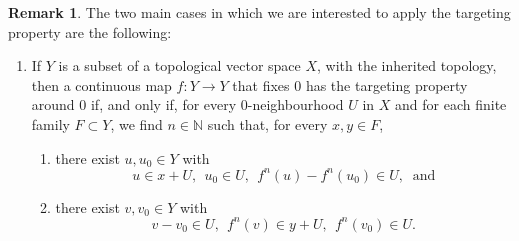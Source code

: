 \documentclass[12pt,english]{amsart}
\numberwithin{equation}{section}
\theoremstyle{plain}
\theoremstyle{definition}
\newtheorem{remark}[theorem]{Remark}
\def\NN{\mathbb N}
\begin{document}
\begin{remark} The two main cases in which we are interested to apply the targeting property are the following: 
\begin{enumerate}
\item[(a)] If $Y$ is a subset of a topological vector space $X$, with the inherited topology, then a continuous map $f\colon Y\to Y$ that fixes $0$ has the targeting property around $0$ if, and only if, for every $0$-neighbourhood $U$ in $X$ and for each finite family $F\subset Y$, we find $n\in \NN$ such that, for every $x,y\in F$,  
\begin{enumerate}
\item[(i)]  there exist $u,u_0\in Y$ with 
\[
u\in x+U, \ \ u_0\in U, \ \ f^n(u)- f^n(u_0)\in U, \ \mbox{ and}
\]
\item[(ii)] there exist $v,v_0\in Y$ with 
\[
v-v_0\in U, \ \ f^n(v)\in y+U, \ \ f^n(v_0)\in  U.  
\] 
\end{enumerate}


\end{enumerate}
\end{remark}
\end{document}
